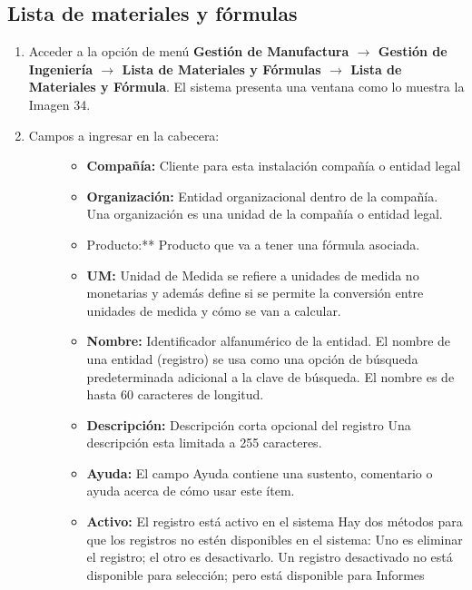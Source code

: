 \documentclass[letterpaper,10pt,spanish]{sphinxmanual}
\begin{document}
\subsection{Lista de materiales y fórmulas}
\label{manufactura-bom:lista-de-materiales-y-formulas}\begin{enumerate}
\item {} 
Acceder a la opción de menú \textbf{Gestión de Manufactura \(\rightarrow\) Gestión de Ingeniería \(\rightarrow\) Lista de Materiales y Fórmulas \(\rightarrow\) Lista de Materiales y Fórmula}. El sistema presenta una ventana como lo muestra la Imagen 34.

\item {} \begin{description}
\item[{Campos a ingresar en la cabecera:}] \leavevmode\begin{itemize}
\item {} 
\textbf{Compañía:} Cliente para esta instalación compañía o entidad legal

\item {} 
\textbf{Organización:} Entidad organizacional dentro de la compañía. Una organización es una unidad de la compañía o entidad legal.

\item {} 
Producto:** Producto que va a tener una fórmula asociada.

\item {} 
\textbf{UM:} Unidad de Medida se refiere a unidades de medida no monetarias y además define si se permite la conversión entre unidades de medida y cómo se van a calcular.

\item {} 
\textbf{Nombre:} Identificador alfanumérico de la entidad. El nombre de una entidad (registro) se usa como una opción de búsqueda predeterminada adicional a la clave de búsqueda. El nombre es de hasta 60 caracteres de longitud.

\item {} 
\textbf{Descripción:} Descripción corta opcional del registro Una descripción esta limitada a 255 caracteres.

\item {} 
\textbf{Ayuda:} El campo Ayuda contiene una sustento, comentario o ayuda acerca de cómo usar este ítem.

\item {} 
\textbf{Activo:} El registro está activo en el sistema Hay dos métodos para que los registros no estén disponibles en el sistema: Uno es eliminar el registro; el otro es desactivarlo. Un registro desactivado no está disponible para selección; pero está disponible para Informes


\end{itemize}
\end{description}
\end{enumerate}
\end{document}
